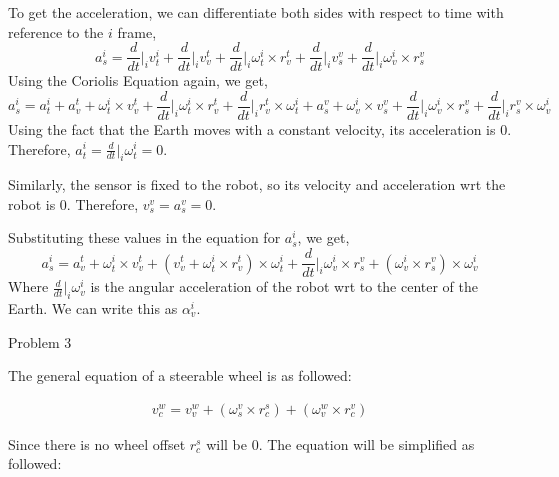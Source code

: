 \documentclass[answers]{exam}
\begin{document}
\begin{questions}
\begin{solution}
\begin{equation*}
        \end{equation*}
        To get the acceleration, we can differentiate both sides with respect to time with reference to the $i$ frame,
        \begin{equation*}
            a^i_s  =  \dfrac{d}{dt}\Big|_i v^i_t + \frac{d}{dt}\Big|_i v^t_v +\frac{d}{dt}\Big|_i \omega^i_t \times r^t_v +\frac{d}{dt}\Big|_i v^v_s + \frac{d}{dt}\Big|_i \omega^i_v \times r^v_s
        \end{equation*}
        Using the Coriolis Equation again, we get,
        \begin{equation*}
            a^i_s  =  a^i_t + a^t_v + \omega^i_t \times v^t_v + \frac{d}{dt}\Big|_i \omega^i_t \times r^t_v + \frac{d}{dt}\Big|_i r^t_v \times \omega^i_t + a^v_s + \omega^i_v \times v^v_s + \frac{d}{dt}\Big|_i \omega^i_v \times r^v_s + \frac{d}{dt}\Big|_i r^v_s \times \omega^i_v
        \end{equation*}
        Using the fact that the Earth moves with a constant velocity, its acceleration is 0. Therefore, $a^i_t = \frac{d}{dt}\Big|_i \omega^i_t = 0$.

        Similarly, the sensor is fixed to the robot, so its velocity and acceleration
        wrt the robot is 0. Therefore, $v^v_s = a^v_s = 0$.

        Substituting these values in the equation for $a^i_s$, we get,
        \begin{equation*}
            a^i_s  =  a^t_v + \omega^i_t \times v^t_v + (v^t_v + \omega^i_t \times r^t_v) \times \omega^i_t + \frac{d}{dt}\Big|_i \omega^i_v \times r^v_s + (\omega^i_v \times r^v_s) \times \omega^i_v
        \end{equation*}
        Where $\frac{d}{dt}\Big|_i \omega^i_v$ is the angular acceleration of the robot wrt to the center of the Earth. We can write this as $\alpha^i_v$.
    \end{solution}

    \question Problem 3
        \begin{solution}

            The general equation of a steerable wheel is as followed:

            \begin{align*}
                v^w_c = v^w_v + ({\omega}^v_s \times r^s_c) + ({\omega}^w_v \times r^v_c)
            \end{align*}

            Since there is no wheel offset $r^s_c$ will be 0. The equation will be
            simplified as followed:


\end{solution}
\end{questions}
\end{document}
